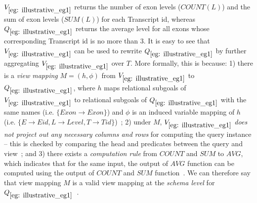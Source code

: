{\begin{example}
$V_{\ref{eg: illustrative_eg1}}$ returns the number of exon levels ($COUNT(L)$) and the sum of exon levels ($SUM(L)$) for each Transcript id,
whereas $Q_{\ref{eg: illustrative_eg1}}$ returns the average level for all exons whose corresponding Transcript id is no more than 3.
It is easy to see that $V_{\ref{eg: illustrative_eg1}}$ can be used to rewrite $Q_{\ref{eg: illustrative_eg1}}$ by further aggregating $V_{\ref{eg: illustrative_eg1}}$ over $T$. More formally, this is because:  1) there is a {\em view mapping} $M=(h, \phi)$ from $V_{\ref{eg: illustrative_eg1}}$ to $Q_{\ref{eg: illustrative_eg1}}$, 
where $h$ maps relational subgoals of $V_{\ref{eg: illustrative_eg1}}$ to relational subgoals of $Q_{\ref{eg: illustrative_eg1}}$ with the same names (i.e. $\{Exon \rightarrow Exon\}$) and $\phi$ is an induced variable mapping of $h$ (i.e. $\{E \rightarrow Eid, L \rightarrow Level, T \rightarrow Tid\}$)~\cite{wu2018data}; 2) under $M$,  $V_{\ref{eg: illustrative_eg1}}$ \textit{does not project out any necessary columns and rows} for computing the query instance -- this is checked by comparing the head and predicates between the query and view~\cite{srivastava1996answering}; 
and 3) there exists a {\em computation rule} from $COUNT$ and $SUM$ to $AVG$, which indicates that for the same input, the output of $AVG$ function can be computed using the output of $COUNT$ and $SUM$ function~\cite{cohen2006user}. We can therefore say that view mapping $M$ is a valid view mapping at the {\em schema level} for $Q_{\ref{eg: illustrative_eg1}}$~\cite{wu2018data}.
 

\end{example}}


